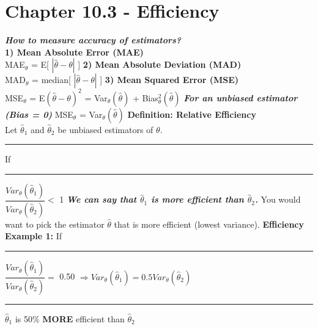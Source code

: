 \documentclass[]{article}
\begin{document}
\newpage
\section{Chapter 10.3 - Efficiency}
\Large\textbf{\textit{How to measure accuracy of estimators?}}\newline
\\
\Large\textbf{1) Mean Absolute Error (MAE)}
\\
MAE$_\theta$ = E[ $|\hat\theta - \theta|$ ]
\newline
\newline
\Large\textbf{2) Mean Absolute Deviation (MAD)}
\\
MAD$_\theta$ = median[ $|\hat\theta - \theta|$ ]
\newline
\newline
\Large\textbf{3) Mean Squared Error (MSE)}
\\
MSE$_\theta$ = E$(\hat\theta - \theta)^2$ = Var$_\theta (\hat\theta)$ + Bias$_\theta ^2 (\hat\theta)$ \newline
\newline
\textbf{\textit{For an unbiased estimator (Bias = 0)}} \newline
MSE$_\theta$  = Var$_\theta (\hat\theta)$
\newline
\newline
\newline
\newline
\Large\textbf{Definition: Relative Efficiency}
\\
\Large Let $\hat\theta_1$ and $\hat\theta_2$ be unbiased estimators of $\theta$.
\newline
\newline
\Large\rule{3cm}{0pt} If \Large\rule{.3cm}{0pt}$\dfrac{  Var_\theta (\hat\theta_1)  }{ Var_\theta (\hat\theta_2)}  < $  1
\newline 
\newline
\textbf{\textit{We can say that $\hat\theta_1$ is more efficient than $\hat\theta_2$.}}
\newline 
You would want to pick the estimator $\hat\theta$ that is more efficient (lowest variance). 
\newline
\newline
\newline
\textbf{Efficiency Example 1:}  If \Large\rule{.3cm}{0pt}$\dfrac{  Var_\theta (\hat\theta_1)  }{ Var_\theta (\hat\theta_2)}  = $  0.50 $\Longrightarrow  Var_\theta (\hat\theta_1) = 0.5  Var_\theta (\hat\theta_2) $ 
\newline\newline\Large\rule{10cm}{0pt}  $\hat\theta_1$ is 50\% \textbf{MORE} efficient than $\hat\theta_2$
\end{document}
